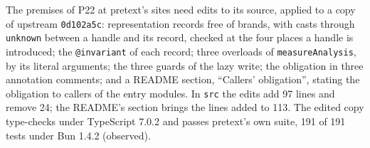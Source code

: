 \documentclass[10pt,a4paper]{article}
\theoremstyle{definition}
\theoremstyle{remark}
\newcommand{\code}[1]{\texttt{#1}}
\begin{document}
The premises of P22 at pretext's sites need edits to its source, applied
to a copy of upstream \code{0d102a5c}: representation records free of
brands, with casts through \code{unknown} between a handle and its record,
checked at the four places a handle is introduced; the
\code{@invariant} of each record; three overloads of
\code{measureAnalysis}, by its literal arguments; the three guards of the
lazy write; the obligation in three annotation comments; and a README
section, ``Callers' obligation'', stating the obligation to callers of
the entry modules. In \code{src} the edits add 97 lines and remove 24; the
README's section brings the lines added to 113. The edited copy
type-checks under TypeScript 7.0.2 and passes pretext's own suite, 191 of
191 tests under Bun 1.4.2 (observed).
\end{document}

